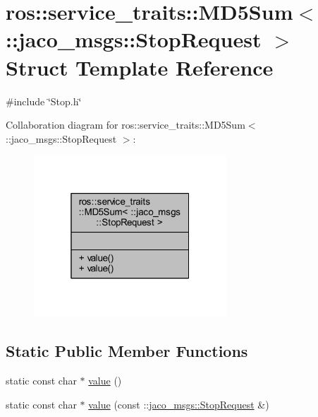 \hypertarget{structros_1_1service__traits_1_1MD5Sum_3_01_1_1jaco__msgs_1_1StopRequest_01_4}{}\section{ros\+:\+:service\+\_\+traits\+:\+:M\+D5\+Sum$<$ \+:\+:jaco\+\_\+msgs\+:\+:Stop\+Request $>$ Struct Template Reference}
\label{structros_1_1service__traits_1_1MD5Sum_3_01_1_1jaco__msgs_1_1StopRequest_01_4}


{\ttfamily \#include \char`\"{}Stop.\+h\char`\"{}}



Collaboration diagram for ros\+:\+:service\+\_\+traits\+:\+:M\+D5\+Sum$<$ \+:\+:jaco\+\_\+msgs\+:\+:Stop\+Request $>$\+:
\nopagebreak
\begin{figure}[H]
\begin{center}
\leavevmode
\includegraphics[width=205pt]{db/d7f/structros_1_1service__traits_1_1MD5Sum_3_01_1_1jaco__msgs_1_1StopRequest_01_4__coll__graph}
\end{center}
\end{figure}
\subsection*{Static Public Member Functions}
\begin{DoxyCompactItemize}
\item 
static const char $\ast$ \hyperlink{structros_1_1service__traits_1_1MD5Sum_3_01_1_1jaco__msgs_1_1StopRequest_01_4_afbcc60409675ae14fb45125891fb0dbb}{value} ()
\item 
static const char $\ast$ \hyperlink{structros_1_1service__traits_1_1MD5Sum_3_01_1_1jaco__msgs_1_1StopRequest_01_4_aa84058be2592bfb224625a00753f966b}{value} (const \+::\hyperlink{namespacejaco__msgs_a7f71a39d70d57c48cf1d0e67cb41d127}{jaco\+\_\+msgs\+::\+Stop\+Request} \&)
\end{DoxyCompactItemize}


